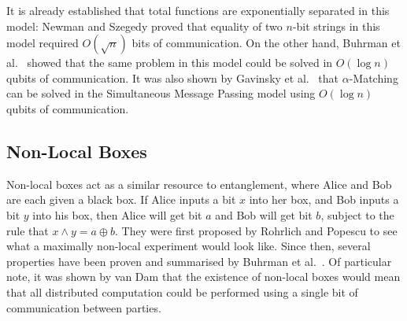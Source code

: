 \documentclass[a4paper]{article}
\begin{document}
\begin{appendices}
        It is already established that total functions are exponentially separated in this model: Newman and Szegedy \cite{Newman:1996:PVP:237814.238004} proved that equality of two $n$-bit strings in this model required $O(\sqrt{n})$ bits of communication. On the other hand, Buhrman et al.~\cite{PhysRevLett.87.167902} showed that the same problem in this model could be solved in $O(\log n)$ qubits of communication. It was also shown by Gavinsky et al.~\cite{Gavinsky:2007:ESO:1250790.1250866} that $\alpha$-Matching can be solved in the Simultaneous Message Passing model using $O(\log n)$ qubits of communication.

        \subsection{Non-Local Boxes}

        Non-local boxes act as a similar resource to entanglement, where Alice and Bob are each given a black box. If Alice inputs a bit $x$ into her box, and Bob inputs a bit $y$ into his box, then Alice will get bit $a$ and Bob will get bit $b$, subject to the rule that $x \wedge y = a \oplus b$. They were first proposed by Rohrlich and Popescu \cite{quant-ph/9508009} to see what a maximally non-local experiment would look like. Since then, several properties have been proven and summarised by Buhrman et al.~\cite{RevModPhys.82.665}. Of particular note, it was shown by van Dam \cite{Dam2012} that the existence of non-local boxes would mean that all distributed computation could be performed using a single bit of communication between parties.

        \end{appendices}
\end{document}

